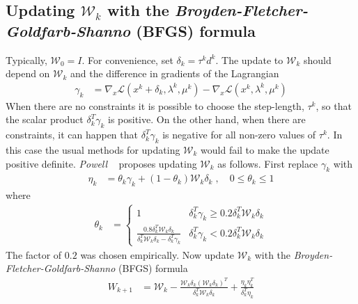 \documentclass[a4paper,twoside,10pt,english]{report}
\begin{document}
\subsection[Updating the Hessian approximation with the 
\emph{Broyden-Fletcher-Goldfarb-Shanno} (BFGS) formula]
{\label{Updating-with-the-BFGS-formula}Updating $\mathcal{W}_{k}$ with the \emph{Broyden-Fletcher-Goldfarb-Shanno} (BFGS) formula}
Typically, $\mathcal{W}_{0}=I$. For convenience, set $\delta_{k}=\tau^{k}d^{k}$.
The update to $\mathcal{W}_{k}$ should depend on $\mathcal{W}_{k}$ and the difference
in gradients of the Lagrangian
\begin{align*}
\gamma_{k} &= \nabla_{x}\mathcal{L}\left(x^{k}+\delta_{k},\lambda^{k},\mu^{k}\right)-\nabla_{x}\mathcal{L}\left(x^{k},\lambda^{k},\mu^{k}\right)
\end{align*}
When there are no constraints it is possible to choose the step-length,
$\tau^{k}$, so that the scalar product $\delta_{k}^{T}\gamma_{k}$
is positive. On the other hand, when there are constraints, it can
happen that $\delta_{k}^{T}\gamma_{k}$ is negative for all non-zero
values of $\tau^{k}$. In this case the usual methods for updating
$\mathcal{W}_{k}$ would fail to make the update positive definite. \emph{Powell} 
~\cite[p.148]{Powell_FastNonlinearConstrainedOptimization}
proposes updating $\mathcal{W}_{k}$ as follows. First replace $\gamma_{k}$
with 
\begin{align*}
\eta_{k} &= \theta_{k}\gamma_{k}+\left(1-\theta_{k}\right)\mathcal{W}_{k}\delta_{k}\;,\quad0\le\theta_{k}\le1
\end{align*}
where 
\begin{align}
\theta_{k} &= \begin{cases}
1 & \delta_{k}^{T}\gamma_{k}\ge0.2\delta_{k}^{T}\mathcal{W}_{k}\delta_{k}\\
\frac{0.8\delta_{k}^{T}\mathcal{W}_{k}\delta_{k}}{\delta_{k}^{T}\mathcal{W}_{k}\delta_{k}-\delta_{k}^{T}\gamma_{k}} & \delta_{k}^{T}\gamma_{k}<0.2\delta_{k}^{T}\mathcal{W}_{k}\delta_{k}
\end{cases}
\label{eqn:damped-BFGS-formula}
\end{align}
The factor of $0.2$ was chosen empirically. Now update $\mathcal{W}_{k}$ with
the \emph{Broyden-Fletcher-Goldfarb-Shanno} (BFGS) formula 
\begin{align*}
W_{k+1} &= \mathcal{W}_{k}-\frac{\mathcal{W}_{k}\delta_{k}\left(\mathcal{W}_{k}\delta_{k}\right)^{T}}{\delta_{k}^{T}\mathcal{W}_{k}\delta_{k}}+\frac{\eta_{k}\eta_{k}^{T}}{\delta_{k}^{T}\eta_{k}}
\end{align*}
\end{document}
